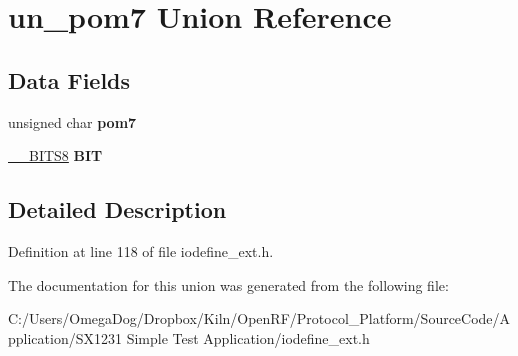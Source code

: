 \hypertarget{unionun__pom7}{\section{un\-\_\-pom7 Union Reference}
\label{unionun__pom7}
}
\subsection*{Data Fields}
\begin{DoxyCompactItemize}
\item 
\hypertarget{unionun__pom7_a8bad61a9ab1433d8273e3b99e4fb2fdf}{unsigned char {\bfseries pom7}}\label{unionun__pom7_a8bad61a9ab1433d8273e3b99e4fb2fdf}

\item 
\hypertarget{unionun__pom7_a00cee5753ff815a63803c19c14423e88}{\hyperlink{struct_____b_i_t_s8}{\-\_\-\-\_\-\-B\-I\-T\-S8} {\bfseries B\-I\-T}}\label{unionun__pom7_a00cee5753ff815a63803c19c14423e88}

\end{DoxyCompactItemize}


\subsection{Detailed Description}


Definition at line 118 of file iodefine\-\_\-ext.\-h.



The documentation for this union was generated from the following file\-:\begin{DoxyCompactItemize}
\item 
C\-:/\-Users/\-Omega\-Dog/\-Dropbox/\-Kiln/\-Open\-R\-F/\-Protocol\-\_\-\-Platform/\-Source\-Code/\-Application/\-S\-X1231 Simple Test Application/iodefine\-\_\-ext.\-h\end{DoxyCompactItemize}
